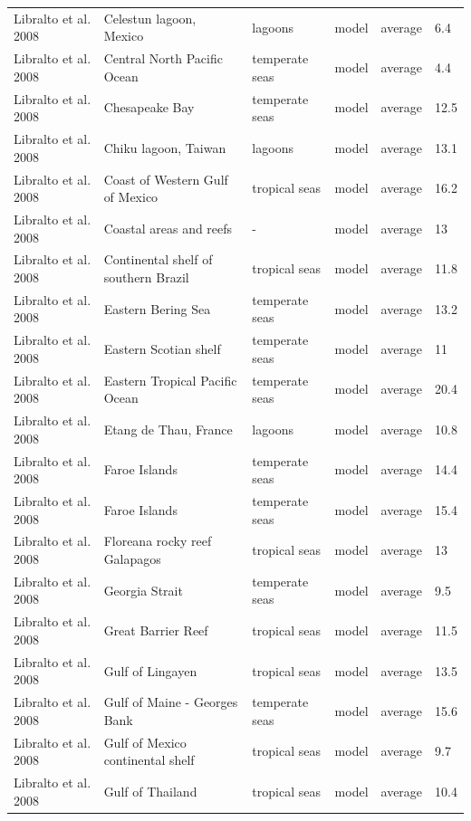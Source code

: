 \documentclass[oneside,12pt,final]{sty/ucthesis-CA2012}
\begin{document}
\begin{mainmatter}
\begin{longtable} {p{4cm}p{3cm}p{2cm}lp{2cm}p{2cm}}
    Libralto et al. 2008  & Celestun lagoon, Mexico & lagoons & model & average & 6.4 \\
    Libralto et al. 2008   & Central North Pacific Ocean & temperate seas & model & average & 4.4 \\
    Libralto et al. 2008   & Chesapeake Bay & temperate seas & model & average & 12.5 \\
    Libralto et al. 2008  & Chiku lagoon, Taiwan & lagoons & model & average & 13.1 \\
    Libralto et al. 2008  & Coast of Western Gulf of Mexico & tropical seas & model & average & 16.2 \\
    Libralto et al. 2008  & Coastal areas and reefs & -    & model & average & 13 \\
    Libralto et al. 2008  & Continental shelf of southern Brazil & tropical seas & model & average & 11.8 \\
    Libralto et al. 2008   & Eastern Bering Sea & temperate seas & model & average & 13.2 \\
    Libralto et al. 2008   & Eastern Scotian shelf & temperate seas & model & average & 11 \\
    Libralto et al. 2008   & Eastern Tropical Pacific Ocean & temperate seas & model & average & 20.4 \\
    Libralto et al. 2008  & Etang de Thau, France  & lagoons & model & average & 10.8 \\
    Libralto et al. 2008   & Faroe Islands & temperate seas & model & average & 14.4 \\
    Libralto et al. 2008  & Faroe Islands & temperate seas & model & average & 15.4 \\
    Libralto et al. 2008  & Floreana rocky reef Galapagos & tropical seas & model & average & 13 \\
    Libralto et al. 2008  &  Georgia Strait & temperate seas & model & average & 9.5 \\
    Libralto et al. 2008   & Great Barrier Reef & tropical seas & model & average & 11.5 \\
    Libralto et al. 2008  & Gulf of Lingayen & tropical seas & model & average & 13.5 \\
    Libralto et al. 2008   & Gulf of Maine - Georges Bank & temperate seas & model & average & 15.6 \\
    Libralto et al. 2008   & Gulf of Mexico continental shelf  & tropical seas & model & average & 9.7 \\
    Libralto et al. 2008  & Gulf of Thailand & tropical seas & model & average & 10.4 \\

\end{longtable}
\end{mainmatter}
\end{document}
